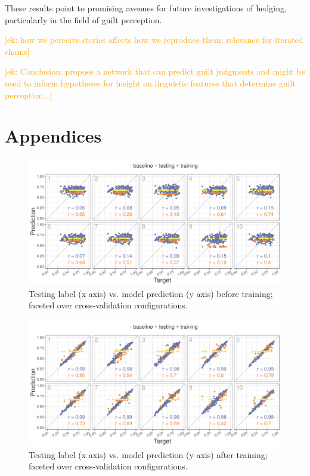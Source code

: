 \documentclass[11pt,a4paper]{article}
\newcommand{\ek}[1]{\textcolor{Orange}{[ek: #1]}}
\begin{document}
These results point to promising avenues for future investigations of hedging, particularly in the field of guilt perception. 

\ek{how we perceive stories affects how we reproduce them; relevance for iterated chains}



\ek{Conclusion: propose a network that can predict guilt judgments and might be used to inform hypotheses for insight on linguistic features that determine guilt perception...}





\onecolumn
\section{Appendices}
\label{sec:appendix}

\begin{figure}[!htb]
	\includegraphics[width=\linewidth]{graphs/all-pred-target-epoch1.pdf}
	\caption{Testing label (x axis) vs. model prediction (y axis) before training; faceted over cross-validation configurations.}
	\label{fig:app-corr-pretraining}
\end{figure}

\begin{figure}[!htb]
	\includegraphics[width=\linewidth]{graphs/all-pred-target-epoch30.pdf}
	\caption{Testing label (x axis) vs. model prediction (y axis) after training; faceted over cross-validation configurations.}
	\label{fig:app-corr-posttraining}
\end{figure}
\end{document}
